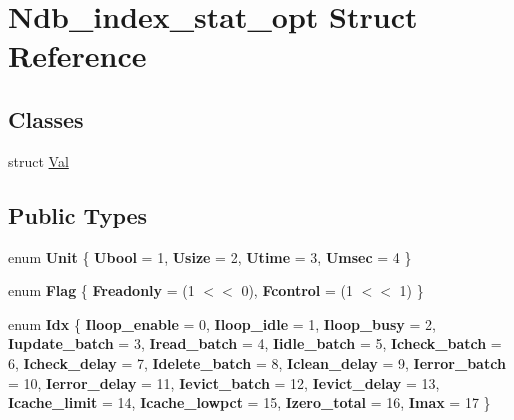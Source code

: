 \hypertarget{structNdb__index__stat__opt}{}\section{Ndb\+\_\+index\+\_\+stat\+\_\+opt Struct Reference}
\label{structNdb__index__stat__opt}
\subsection*{Classes}
\begin{DoxyCompactItemize}
\item 
struct \mbox{\hyperlink{structNdb__index__stat__opt_1_1Val}{Val}}
\end{DoxyCompactItemize}
\subsection*{Public Types}
\begin{DoxyCompactItemize}
\item 
\mbox{\label{structNdb__index__stat__opt_aca34aa0d0e12856c58c1e498274fb984}} 
enum {\bfseries Unit} \{ {\bfseries Ubool} = 1, 
{\bfseries Usize} = 2, 
{\bfseries Utime} = 3, 
{\bfseries Umsec} = 4
 \}
\item 
\mbox{\label{structNdb__index__stat__opt_a70ffce7a2a4e903d8067b359ca61c755}} 
enum {\bfseries Flag} \{ {\bfseries Freadonly} = (1 $<$$<$ 0), 
{\bfseries Fcontrol} = (1 $<$$<$ 1)
 \}
\item 
\mbox{\label{structNdb__index__stat__opt_a205e4f18699d9497d4d9f113af2a5d91}} 
enum {\bfseries Idx} \{ \newline
{\bfseries Iloop\+\_\+enable} = 0, 
{\bfseries Iloop\+\_\+idle} = 1, 
{\bfseries Iloop\+\_\+busy} = 2, 
{\bfseries Iupdate\+\_\+batch} = 3, 
\newline
{\bfseries Iread\+\_\+batch} = 4, 
{\bfseries Iidle\+\_\+batch} = 5, 
{\bfseries Icheck\+\_\+batch} = 6, 
{\bfseries Icheck\+\_\+delay} = 7, 
\newline
{\bfseries Idelete\+\_\+batch} = 8, 
{\bfseries Iclean\+\_\+delay} = 9, 
{\bfseries Ierror\+\_\+batch} = 10, 
{\bfseries Ierror\+\_\+delay} = 11, 
\newline
{\bfseries Ievict\+\_\+batch} = 12, 
{\bfseries Ievict\+\_\+delay} = 13, 
{\bfseries Icache\+\_\+limit} = 14, 
{\bfseries Icache\+\_\+lowpct} = 15, 
\newline
{\bfseries Izero\+\_\+total} = 16, 
{\bfseries Imax} = 17
 \}
\end{DoxyCompactItemize}
